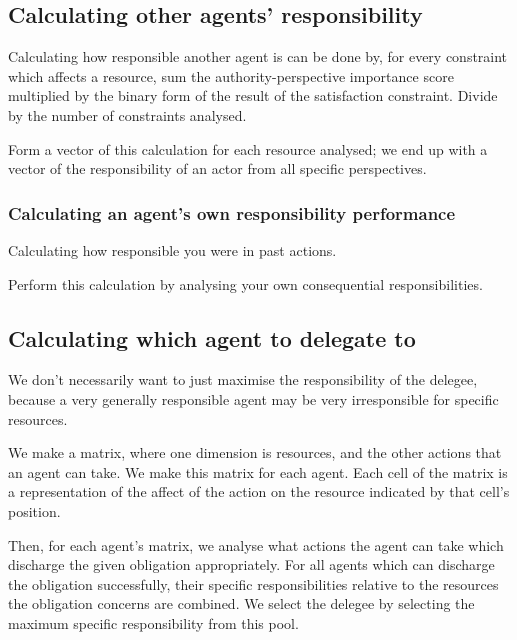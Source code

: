 \documentclass{article}
\begin{document}
\subsection{Calculating other agents' responsibility}

Calculating how responsible another agent is can be done by, for every constraint which affects a resource, sum the
authority-perspective importance score multiplied by the binary form of the result of the satisfaction
constraint. Divide by the number of constraints analysed.\par

Form a vector of this calculation for each resource analysed; we end up with a vector of the responsibility of an actor
from all specific perspectives.\par

\subsubsection{Calculating an agent's own responsibility performance}

Calculating how responsible you were in past actions.

Perform this calculation by analysing your own consequential responsibilities.\par

\subsection{Calculating which agent to delegate to}

We don't necessarily want to just maximise the responsibility of the delegee, because a very generally responsible agent
may be very irresponsible for specific resources. \par

We make a matrix, where one dimension is resources, and the other actions that an agent can take. We make this matrix
for each agent. Each cell of the matrix is a representation of the affect of the action on the resource indicated by
that cell's position.\par

Then, for each agent's matrix, we analyse what actions the agent can take which discharge the given obligation
appropriately. For all agents which can discharge the obligation successfully, their specific responsibilities relative
to the resources the obligation concerns are combined. We select the delegee
by selecting the maximum specific responsibility from this pool.\par
\end{document}
